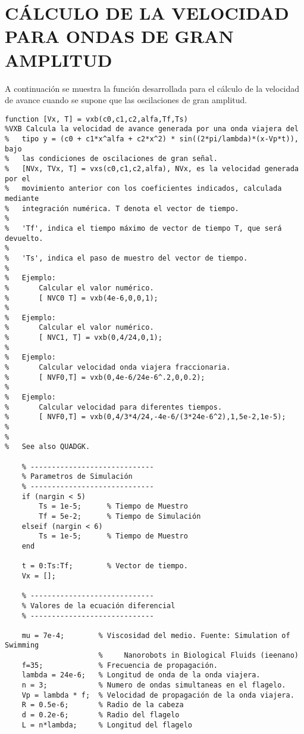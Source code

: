 \section{CÁLCULO DE LA VELOCIDAD PARA ONDAS DE GRAN AMPLITUD} \label{anex:Anexo1}
A continuación se muestra la función desarrollada para el cálculo de la velocidad de avance cuando se supone que las oscilaciones de gran amplitud.

\begin{lstlisting}[]
function [Vx, T] = vxb(c0,c1,c2,alfa,Tf,Ts)
%VXB Calcula la velocidad de avance generada por una onda viajera del
%   tipo y = (c0 + c1*x^alfa + c2*x^2) * sin((2*pi/lambda)*(x-Vp*t)), bajo
%   las condiciones de oscilaciones de gran señal.
%   [NVx, TVx, T] = vxs(c0,c1,c2,alfa), NVx, es la velocidad generada por el
%   movimiento anterior con los coeficientes indicados, calculada mediante
%   integración numérica. T denota el vector de tiempo.
%
%   'Tf', indica el tiempo máximo de vector de tiempo T, que será devuelto.
%
%   'Ts', indica el paso de muestro del vector de tiempo.
%
%   Ejemplo:
%       Calcular el valor numérico.
%       [ NVC0 T] = vxb(4e-6,0,0,1);
%
%   Ejemplo:
%       Calcular el valor numérico.
%       [ NVC1, T] = vxb(0,4/24,0,1);
%
%   Ejemplo:
%       Calcular velocidad onda viajera fraccionaria.
%       [ NVF0,T] = vxb(0,4e-6/24e-6^.2,0,0.2);
%
%   Ejemplo:
%       Calcular velocidad para diferentes tiempos.
%       [ NVF0,T] = vxb(0,4/3*4/24,-4e-6/(3*24e-6^2),1,5e-2,1e-5);
%
%   
%   See also QUADGK.

    % -----------------------------
    % Parametros de Simulación
    % -----------------------------
    if (nargin < 5)
        Ts = 1e-5;      % Tiempo de Muestro
        Tf = 5e-2;      % Tiempo de Simulación    
    elseif (nargin < 6)
        Ts = 1e-5;      % Tiempo de Muestro    
    end

    t = 0:Ts:Tf;        % Vector de tiempo.
    Vx = [];

    % -----------------------------
    % Valores de la ecuación diferencial
    % -----------------------------

    mu = 7e-4;        % Viscosidad del medio. Fuente: Simulation of Swimming
                      %     Nanorobots in Biological Fluids (ieenano)
    f=35;             % Frecuencia de propagación.
    lambda = 24e-6;   % Longitud de onda de la onda viajera.
    n = 3;            % Numero de ondas simultaneas en el flagelo.      
    Vp = lambda * f;  % Velocidad de propagación de la onda viajera.
    R = 0.5e-6;       % Radio de la cabeza 
    d = 0.2e-6;       % Radio del flagelo
    L = n*lambda;     % Longitud del flagelo


\end{lstlisting}
